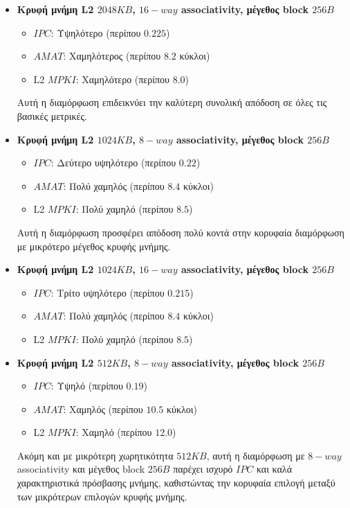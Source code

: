 \documentclass{article}
\begin{document}
\begin{itemize}
    \item \textbf{Κρυφή μνήμη L2 $2048KB$, $16-way$ associativity, μέγεθος block $256B$}
    \begin{itemize}
        \item $IPC$: Υψηλότερο (περίπου $0.225$)
        \item $AMAT$: Χαμηλότερος (περίπου $8.2$ κύκλοι)
        \item L2 $MPKI$: Χαμηλότερο (περίπου $8.0$)
    \end{itemize}
    Αυτή η διαμόρφωση επιδεικνύει την καλύτερη συνολική απόδοση σε όλες τις βασικές μετρικές.

    \item \textbf{Κρυφή μνήμη L2 $1024KB$, $8-way$ associativity, μέγεθος block $256B$}
    \begin{itemize}
        \item $IPC$: Δεύτερο υψηλότερο (περίπου $0.22$)
        \item $AMAT$: Πολύ χαμηλός (περίπου $8.4$ κύκλοι)
        \item L2 $MPKI$: Πολύ χαμηλό (περίπου $8.5$)
    \end{itemize}
    Αυτή η διαμόρφωση προσφέρει απόδοση πολύ κοντά στην κορυφαία διαμόρφωση με μικρότερο μέγεθος κρυφής μνήμης.

    \item \textbf{Κρυφή μνήμη L2 $1024KB$, $16-way$ associativity, μέγεθος block $256B$}
    \begin{itemize}
        \item $IPC$: Τρίτο υψηλότερο (περίπου $0.215$)
        \item $AMAT$: Πολύ χαμηλός (περίπου $8.4$ κύκλοι)
        \item L2 $MPKI$: Πολύ χαμηλό (περίπου $8.5$)
    \end{itemize}

    \item \textbf{Κρυφή μνήμη L2 $512KB$, $8-way$ associativity, μέγεθος block $256B$}
    \begin{itemize}
        \item $IPC$: Υψηλό (περίπου $0.19$)
        \item $AMAT$: Χαμηλός (περίπου $10.5$ κύκλοι)
        \item L2 $MPKI$: Χαμηλό (περίπου $12.0$)
    \end{itemize}
    Ακόμη και με μικρότερη χωρητικότητα $512KB$, αυτή η διαμόρφωση με $8-way$ associativity και μέγεθος block $256B$ παρέχει ισχυρό $IPC$ και καλά χαρακτηριστικά πρόσβασης μνήμης, καθιστώντας την κορυφαία επιλογή μεταξύ των μικρότερων επιλογών κρυφής μνήμης.
\end{itemize}
\end{document}
